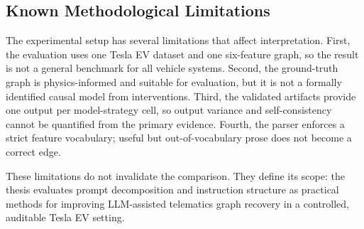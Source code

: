 \subsection{Known Methodological Limitations}

The experimental setup has several limitations that affect interpretation.
First, the evaluation uses one Tesla EV dataset and one six-feature graph, so
the result is not a general benchmark for all vehicle systems. Second, the
ground-truth graph is physics-informed and suitable for evaluation, but it is
not a formally identified causal model from interventions. Third, the
validated artifacts provide one output per model-strategy cell, so output
variance and self-consistency cannot be quantified from the primary evidence.
Fourth, the parser enforces a strict feature vocabulary; useful but
out-of-vocabulary prose does not become a correct edge.

These limitations do not invalidate the comparison. They define its scope:
the thesis evaluates prompt decomposition and instruction structure as
practical methods for improving LLM-assisted telematics graph recovery in a
controlled, auditable Tesla EV setting.

